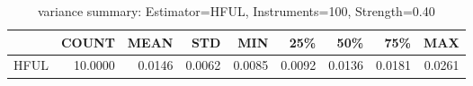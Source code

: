 \begin{table}[ht]
\centering
\caption{variance summary: Estimator=HFUL, Instruments=100, Strength=0.40}
\begin{tabular}{lrrrrrrrr}
\toprule
 & COUNT & MEAN & STD & MIN & 25\% & 50\% & 75\% & MAX \\
\midrule
HFUL & 10.0000 & 0.0146 & 0.0062 & 0.0085 & 0.0092 & 0.0136 & 0.0181 & 0.0261 \\
\bottomrule
\end{tabular}
\end{table}
